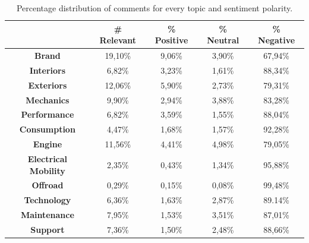 \begin{table}[H]
	\renewcommand{\arraystretch}{1.3}
	\centering
	\begin{tabular}{| c | c | c | c | c |} 
		\hline
		& \textbf{\# Relevant} & \textbf{\% Positive} & \textbf{\% Neutral} & \textbf{\% Negative} \\ [.06cm]
		\hline
		\hline
		\textbf{Brand}& 19,10\% & 9,06\% & 3,90\% & 67,94\% \\ [.06cm]
		\hline
		\textbf{Interiors}& 6,82\% & 3,23\% & 1,61\% & 88,34\% \\ [.06cm]
		\hline
		\textbf{Exteriors}& 12,06\% & 5,90\% & 2,73\% & 79,31\%  \\ [.06cm]
		\hline
		\textbf{Mechanics}& 9,90\% & 2,94\% & 3,88\% & 83,28\% \\ [.06cm]
		\hline
		\textbf{Performance}& 6,82\% & 3,59\% & 1,55\% & 88,04\% \\ [.06cm]
		\hline
		\textbf{Consumption}& 4,47\% & 1,68\% & 1,57\% & 92,28\% \\ [.06cm]
		\hline
		\textbf{Engine}& 11,56\% & 4,41\% & 4,98\% & 79,05\% \\ [.06cm]
		\hline
		\textbf{Electrical Mobility}& 2,35\% & 0,43\% & 1,34\% & 95,88\% \\ [.06cm]
		\hline
		\textbf{Offroad}& 0,29\% & 0,15\% & 0,08\% & 99,48\% \\ [.06cm]
		\hline
		\textbf{Technology}& 6,36\% & 1,63\% & 2,87\% & 89.14\% \\ [.06cm]
		\hline
		\textbf{Maintenance}& 7,95\% & 1,53\% & 3,51\% & 87,01\% \\ [.06cm]
		\hline
		\textbf{Support}& 7,36\% & 1,50\% & 2,48\% & 88,66\% \\ [.06cm]
		\hline
		
	\end{tabular}
	\caption{Percentage distribution of comments for every topic and sentiment polarity.}
	\label{table:annotations-distribution-perc}
\end{table}







